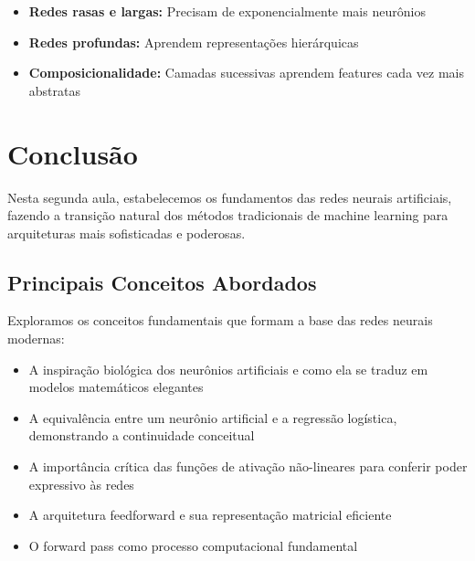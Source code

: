 \documentclass[a4paper,12pt]{article}
\begin{document}
\begin{itemize}
    \item \textbf{Redes rasas e largas:} Precisam de exponencialmente mais neurônios
    \item \textbf{Redes profundas:} Aprendem representações hierárquicas
    \item \textbf{Composicionalidade:} Camadas sucessivas aprendem features cada vez mais abstratas
\end{itemize}

\section{Conclusão}

Nesta segunda aula, estabelecemos os fundamentos das redes neurais artificiais, fazendo a transição natural dos métodos tradicionais de machine learning para arquiteturas mais sofisticadas e poderosas.

\subsection{Principais Conceitos Abordados}

Exploramos os conceitos fundamentais que formam a base das redes neurais modernas:

\begin{itemize}
    \item A inspiração biológica dos neurônios artificiais e como ela se traduz em modelos matemáticos elegantes
    \item A equivalência entre um neurônio artificial e a regressão logística, demonstrando a continuidade conceitual
    \item A importância crítica das funções de ativação não-lineares para conferir poder expressivo às redes
    \item A arquitetura feedforward e sua representação matricial eficiente
    \item O forward pass como processo computacional fundamental
\end{itemize}
\end{document}
